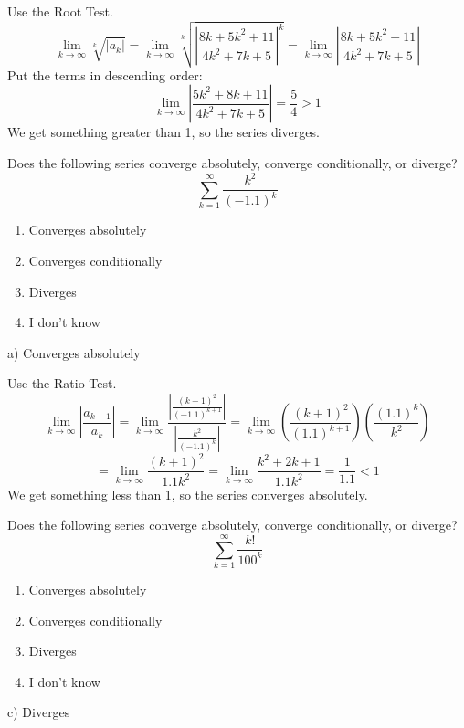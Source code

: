 \documentclass[addpoints,12pt,answers]{exam}
\begin{document}
\begin{questions}
\begin{solution}
    Use the Root Test.
    $$\lim_{k\to\infty}\sqrt[k]{|a_k|}=\lim_{k\to\infty}\sqrt[k]{\left|\frac{8k+5k^2+11}{4k^2+7k+5}\right|^k}=\lim_{k\to\infty}\left|\frac{8k+5k^2+11}{4k^2+7k+5}\right|$$
    Put the terms in descending order:
    $$\lim_{k\to\infty}\left|\frac{5k^2+8k+11}{4k^2+7k+5}\right|=\frac{5}{4}>1$$
    We get something greater than 1, so the series diverges.
  \end{solution}
  \newpage
  \question
  Does the following series converge absolutely, converge conditionally, or diverge?
  $$\sum_{k=1}^\infty\frac{k^2}{(-1.1)^k}$$
  \begin{enumerate}[label=\alph*)]
    \item
    Converges absolutely
    \item
    Converges conditionally
    \item
    Diverges
    \item
    I don't know
  \end{enumerate}
  \begin{solution}
    a) Converges absolutely
    
    Use the Ratio Test.
    $$\lim_{k\to\infty}\left|\frac{a_{k+1}}{a_k}\right|=\lim_{k\to\infty}\frac{\left|\frac{(k+1)^2}{(-1.1)^{k+1}}\right|}{\left|\frac{k^2}{(-1.1)^k}\right|}=\lim_{k\to\infty}\left(\frac{(k+1)^2}{(1.1)^{k+1}}\right)\left(\frac{(1.1)^k}{k^2}\right)$$
    $$=\lim_{k\to\infty}\frac{(k+1)^2}{1.1k^2}=\lim_{k\to\infty}\frac{k^2+2k+1}{1.1k^2}=\frac{1}{1.1}<1$$
    We get something less than 1, so the series converges absolutely.
  \end{solution}
  \newpage
  \question
  Does the following series converge absolutely, converge conditionally, or diverge?
  $$\sum_{k=1}^\infty\frac{k!}{100^k}$$
  \begin{enumerate}[label=\alph*)]
    \item
    Converges absolutely
    \item
    Converges conditionally
    \item
    Diverges
    \item
    I don't know
  \end{enumerate}
  \begin{solution}
    c) Diverges
    

\end{solution}
\end{questions}
\end{document}
